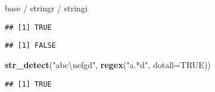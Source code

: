 \documentclass[ignorenonframetext,]{beamer}
\newenvironment{Shaded}{\begin{snugshade}}{\end{snugshade}}
\newcommand{\KeywordTok}[1]{\textcolor[rgb]{0.13,0.29,0.53}{\textbf{{#1}}}}
\newcommand{\DataTypeTok}[1]{\textcolor[rgb]{0.13,0.29,0.53}{{#1}}}
\newcommand{\CharTok}[1]{\textcolor[rgb]{0.31,0.60,0.02}{{#1}}}
\newcommand{\StringTok}[1]{\textcolor[rgb]{0.31,0.60,0.02}{{#1}}}
\newcommand{\OtherTok}[1]{\textcolor[rgb]{0.56,0.35,0.01}{{#1}}}
\newcommand{\NormalTok}[1]{{#1}}
\begin{document}
\begin{frame}[fragile]{base / stringr / stringi}

\begin{Shaded}
\end{Shaded}

\begin{verbatim}
## [1] TRUE
\end{verbatim}

\begin{Shaded}
\end{Shaded}

\begin{verbatim}
## [1] FALSE
\end{verbatim}

\begin{Shaded}
\begin{Highlighting}[]
\KeywordTok{str_detect}\NormalTok{(}\StringTok{"abc}\CharTok{\textbackslash{}n}\StringTok{efgd"}\NormalTok{, }\KeywordTok{regex}\NormalTok{(}\StringTok{"a.*d"}\NormalTok{,  }\DataTypeTok{dotall=}\OtherTok{TRUE}\NormalTok{))}
\end{Highlighting}
\end{Shaded}

\begin{verbatim}
## [1] TRUE
\end{verbatim}

\end{frame}
\end{document}
